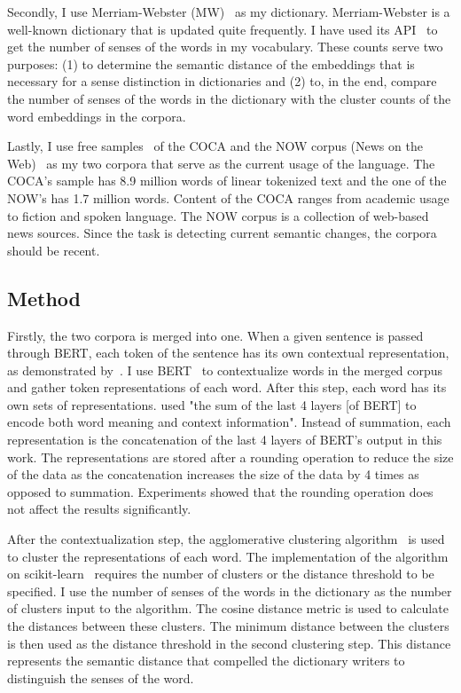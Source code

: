 \documentclass[11pt]{article}
\begin{document}
Secondly, I use Merriam-Webster (MW)~\cite{mw-2023-dictionary} as my dictionary.
Merriam-Webster is a well-known dictionary that is updated quite frequently.
I have used its API~\cite{mw-2023-api} to get the number of senses of the words in my vocabulary.
These counts serve two purposes: (1) to determine the semantic distance of the embeddings that is necessary for a sense distinction in dictionaries and (2) to, in the end, compare the number of senses of the words in the dictionary with the cluster counts of the word embeddings in the corpora.

Lastly, I use free samples~\cite{corpus-data-2023-corpora} of the COCA and the NOW corpus (News on the Web)~\cite{english-corpora-2016-now} as my two corpora that serve as the current usage of the language.
The COCA's sample has 8.9 million words of linear tokenized text and the one of the NOW's has 1.7 million words.
Content of the COCA ranges from academic usage to fiction and spoken language.
The NOW corpus is a collection of web-based news sources.
Since the task is detecting current semantic changes, the corpora should be recent.

\subsection{Method}

Firstly, the two corpora is merged into one.
When a given sentence is passed through BERT, each token of the sentence has its own contextual representation, as demonstrated by~\cite{pasini-etal-2020-clubert}.
I use BERT~\cite{devlin-etal-2019-bert} to contextualize words in the merged corpus and gather token representations of each word.
After this step, each word has its own sets of representations.
\cite{zhou-li-2020-temporalteller} used "the sum of the last 4 layers [of BERT] to encode both word meaning and context information".
Instead of summation, each representation is the concatenation of the last 4 layers of BERT's output in this work.
The representations are stored after a rounding operation to reduce the size of the data as the concatenation increases the size of the data by 4 times as opposed to summation.
Experiments showed that the rounding operation does not affect the results significantly.

After the contextualization step, the agglomerative clustering algorithm~\cite{florek1951liaison} is used to cluster the representations of each word.
The implementation of the algorithm on scikit-learn~\cite{scikit-learn} requires the number of clusters or the distance threshold to be specified.
I use the number of senses of the words in the dictionary as the number of clusters input to the algorithm.
The cosine distance metric is used to calculate the distances between these clusters.
The minimum distance between the clusters is then used as the distance threshold in the second clustering step.
This distance represents the semantic distance that compelled the dictionary writers to distinguish the senses of the word.
\end{document}
